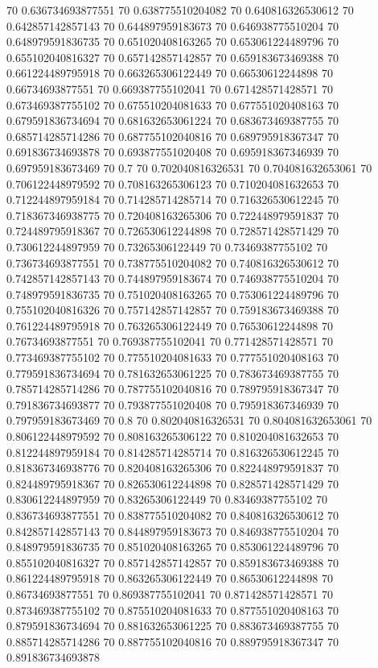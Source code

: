 {70 0.636734693877551
70 0.638775510204082
70 0.640816326530612
70 0.642857142857143
70 0.644897959183673
70 0.646938775510204
70 0.648979591836735
70 0.651020408163265
70 0.653061224489796
70 0.655102040816327
70 0.657142857142857
70 0.659183673469388
70 0.661224489795918
70 0.663265306122449
70 0.66530612244898
70 0.66734693877551
70 0.669387755102041
70 0.671428571428571
70 0.673469387755102
70 0.675510204081633
70 0.677551020408163
70 0.679591836734694
70 0.681632653061224
70 0.683673469387755
70 0.685714285714286
70 0.687755102040816
70 0.689795918367347
70 0.691836734693878
70 0.693877551020408
70 0.695918367346939
70 0.697959183673469
70 0.7
70 0.702040816326531
70 0.704081632653061
70 0.706122448979592
70 0.708163265306123
70 0.710204081632653
70 0.712244897959184
70 0.714285714285714
70 0.716326530612245
70 0.718367346938775
70 0.720408163265306
70 0.722448979591837
70 0.724489795918367
70 0.726530612244898
70 0.728571428571429
70 0.730612244897959
70 0.73265306122449
70 0.73469387755102
70 0.736734693877551
70 0.738775510204082
70 0.740816326530612
70 0.742857142857143
70 0.744897959183674
70 0.746938775510204
70 0.748979591836735
70 0.751020408163265
70 0.753061224489796
70 0.755102040816326
70 0.757142857142857
70 0.759183673469388
70 0.761224489795918
70 0.763265306122449
70 0.76530612244898
70 0.76734693877551
70 0.769387755102041
70 0.771428571428571
70 0.773469387755102
70 0.775510204081633
70 0.777551020408163
70 0.779591836734694
70 0.781632653061225
70 0.783673469387755
70 0.785714285714286
70 0.787755102040816
70 0.789795918367347
70 0.791836734693877
70 0.793877551020408
70 0.795918367346939
70 0.797959183673469
70 0.8
70 0.802040816326531
70 0.804081632653061
70 0.806122448979592
70 0.808163265306122
70 0.810204081632653
70 0.812244897959184
70 0.814285714285714
70 0.816326530612245
70 0.818367346938776
70 0.820408163265306
70 0.822448979591837
70 0.824489795918367
70 0.826530612244898
70 0.828571428571429
70 0.830612244897959
70 0.83265306122449
70 0.83469387755102
70 0.836734693877551
70 0.838775510204082
70 0.840816326530612
70 0.842857142857143
70 0.844897959183673
70 0.846938775510204
70 0.848979591836735
70 0.851020408163265
70 0.853061224489796
70 0.855102040816327
70 0.857142857142857
70 0.859183673469388
70 0.861224489795918
70 0.863265306122449
70 0.86530612244898
70 0.86734693877551
70 0.869387755102041
70 0.871428571428571
70 0.873469387755102
70 0.875510204081633
70 0.877551020408163
70 0.879591836734694
70 0.881632653061225
70 0.883673469387755
70 0.885714285714286
70 0.887755102040816
70 0.889795918367347
70 0.891836734693878
}
